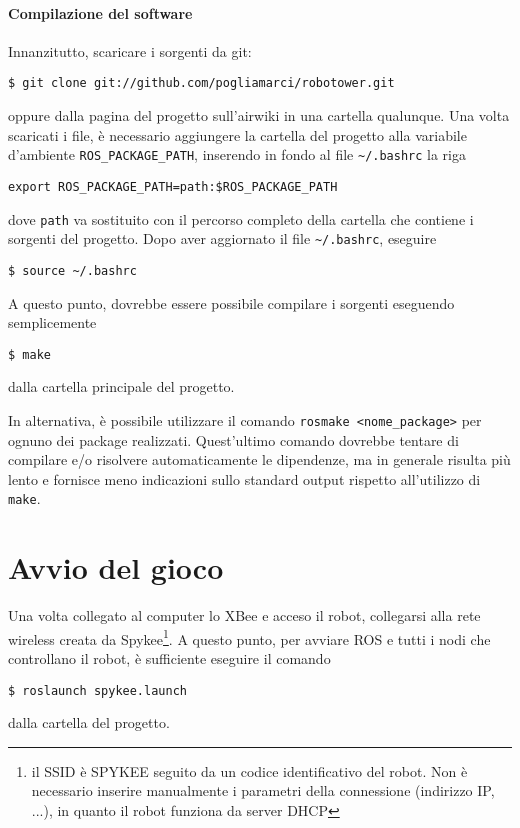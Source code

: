 \paragraph{Compilazione del software} Innanzitutto, scaricare i sorgenti da git:
\begin{verbatim}
$ git clone git://github.com/pogliamarci/robotower.git
\end{verbatim}
oppure dalla pagina del progetto sull'airwiki in una cartella qualunque. Una volta scaricati i file, è necessario aggiungere la cartella del progetto alla variabile d'ambiente \verb|ROS_PACKAGE_PATH|, inserendo in fondo al file \verb|~/.bashrc| la riga
\begin{verbatim}
export ROS_PACKAGE_PATH=path:$ROS_PACKAGE_PATH
\end{verbatim}
dove \verb|path| va sostituito con il percorso completo della cartella che contiene i sorgenti del progetto. Dopo aver aggiornato il file \verb|~/.bashrc|, eseguire
\begin{verbatim}
$ source ~/.bashrc
\end{verbatim}
A questo punto, dovrebbe essere possibile compilare i sorgenti eseguendo semplicemente
\begin{verbatim}
$ make
\end{verbatim}
dalla cartella principale del progetto.

\begin{nota}
In alternativa, è possibile utilizzare il comando \verb|rosmake <nome_package>| per ognuno dei package realizzati. Quest'ultimo comando dovrebbe tentare di compilare e/o risolvere automaticamente le dipendenze, ma in generale risulta più lento e fornisce meno indicazioni sullo standard output rispetto all'utilizzo di \verb|make|.
\end{nota}

\section{Avvio del gioco} Una volta collegato al computer lo XBee e acceso il robot, collegarsi alla rete wireless creata da Spykee\footnote{il SSID è SPYKEE seguito da un codice identificativo del robot. Non è necessario inserire manualmente i parametri della connessione (indirizzo IP, ...), in quanto il robot funziona da server DHCP}. A questo punto, per avviare ROS e tutti i nodi che controllano il robot, è sufficiente eseguire il comando
\begin{verbatim}
$ roslaunch spykee.launch
\end{verbatim}
dalla cartella del progetto.

